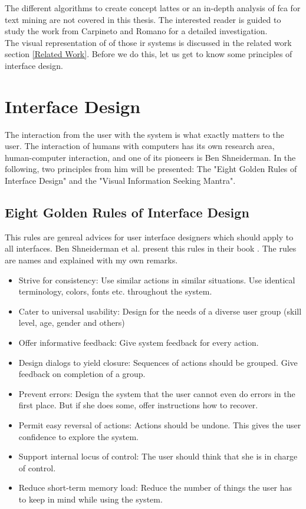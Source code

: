 \documentclass[11pt]{report}
\begin{document}
{{The different algorithms to create concept lattes or an in-depth analysis of \acrshort{fca} for text mining are not covered in this thesis. The interested reader is guided to study the work from Carpineto and Romano \cite{carpineto2004concept} for a detailed investigation. \\

The visual representation of of those \acrshort{ir} systems is discussed in the related work section \ref{Related Work}. Before we do this, let us get to know some principles of interface design. \\

\section{Interface Design}
\label{id}

The interaction from the user with the system is what exactly matters to the user. The interaction of humans with computers has its own research area, human-computer interaction, and one of its pioneers is Ben Shneiderman. In the following, two principles from him will be presented: The "Eight Golden Rules of Interface Design" and the "Visual Information Seeking Mantra".

\subsection{Eight Golden Rules of Interface Design}

This rules are genreal advices for user interface designers which should apply to all interfaces. Ben Shneiderman et al. present this rules in their book \cite{Shneiderman2010}. The rules are names and explained with my own remarks. \\

\begin{itemize}
	\item Strive for consistency: Use similar actions in similar situations. Use identical terminology, colors, fonts etc. throughout the system.	
	\item Cater to universal usability: Design for the needs of a diverse user group (skill level, age, gender and others)
	\item Offer informative feedback: Give system feedback for every action.
	\item Design dialogs to yield closure: Sequences of actions should be grouped. Give feedback on completion of a group.
	\item Prevent errors: Design the system that the user cannot even do errors in the first place. But if she does some, offer instructions how to recover.
	\item Permit easy reversal of actions: Actions should be undone. This gives the user confidence to explore the system.
	\item Support internal locus of control: The user should think that she is in charge of control.
	\item Reduce short-term memory load: Reduce the number of things the user has to keep in mind while using the system.
\end{itemize}

}}
\end{document}
